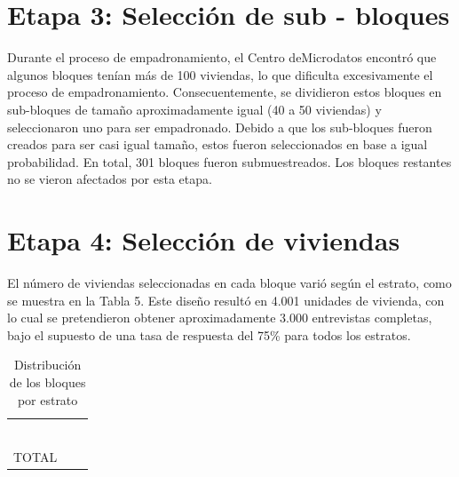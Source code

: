 \documentclass[
]{book}
\begin{document}
\hypertarget{etapa-3-selecciuxf3n-de-sub---bloques}{%
\section{Etapa 3: Selección de sub - bloques}\label{etapa-3-selecciuxf3n-de-sub---bloques}}

Durante el proceso de empadronamiento, el Centro deMicrodatos encontró que algunos bloques tenían más de 100 viviendas, lo que dificulta excesivamente el proceso de empadronamiento. Consecuentemente, se dividieron estos bloques en sub-bloques de tamaño aproximadamente igual (40 a 50 viviendas) y seleccionaron uno para ser empadronado. Debido a que los sub-bloques fueron creados para ser casi igual tamaño, estos fueron seleccionados en base a igual probabilidad. En total, 301 bloques fueron submuestreados. Los bloques restantes no se vieron afectados por esta etapa.

\hypertarget{etapa-4-selecciuxf3n-de-viviendas}{%
\section{Etapa 4: Selección de viviendas}\label{etapa-4-selecciuxf3n-de-viviendas}}

El número de viviendas seleccionadas en cada bloque varió según el estrato, como se muestra en la Tabla 5. Este diseño resultó en 4.001 unidades de vivienda, con lo cual se pretendieron obtener aproximadamente 3.000 entrevistas completas, bajo el supuesto de una tasa de respuesta del 75\% para todos los estratos.

\begin{table}

\caption{\label{tab:unnamed-chunk-6}\label{tab:bloques}Distribución de los bloques por estrato}
\centering
\begin{tabular}[t]{>{\raggedright\arraybackslash}p{4cm}>{\raggedright\arraybackslash}p{4cm}>{\raggedright\arraybackslash}p{2cm}}
\toprule
\cellcolor{white}{Estrato} & \cellcolor{white}{Definición (N° habitantes)} & \cellcolor{white}{n HHs}\\
\midrule
\cellcolor{white}{Gran Santiago} & \cellcolor{white}{} & \cellcolor{white}{5}\\
\cellcolor{white}{Gran Valparaíso} & \cellcolor{white}{} & \cellcolor{white}{5}\\
\cellcolor{white}{Gran Concepción} & \cellcolor{white}{} & \cellcolor{white}{5}\\
\cellcolor{white}{Ciudades Grandes} & \cellcolor{white}{> 100 mil} & \cellcolor{white}{3}\\
\cellcolor{white}{Ciudades Medianas} & \cellcolor{white}{> 30 mil} & \cellcolor{white}{3}\\
\addlinespace
\cellcolor{white}{Ciudades Pequeñas} & \cellcolor{white}{> 10 mil} & \cellcolor{white}{3}\\
TOTAL &  & 4001\\
\bottomrule
\end{tabular}
\end{table}
\end{document}
